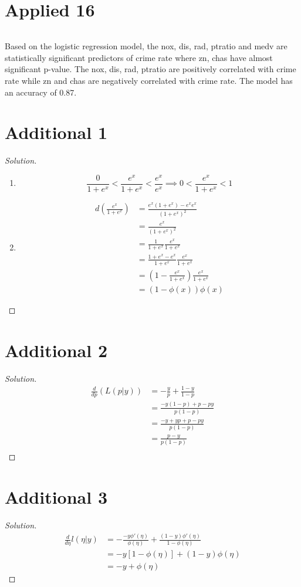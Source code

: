 \documentclass{article}
\newenvironment{solution}
  {\renewcommand\qedsymbol{$\blacksquare$}\begin{proof}[Solution]$ $}
  {\end{proof}}
\begin{document}
\newpage
\section{Applied 16}
\inputminted{r}{q16.R}
Based on the logistic regression model, the nox, dis, rad, ptratio and medv are statistically significant predictors of crime rate where zn, chas have almost significant p-value. The nox, dis, rad, ptratio are positively correlated with crime rate while zn and chas are negatively correlated with crime rate. The model has an accuracy of 0.87.

\newpage
\section{Additional 1}
\begin{solution}
\begin{enumerate}[label=(\alph*)]
\item 
\[\frac{0}{1+e^x} < \frac{e^x}{1+e^x} < \frac{e^{x}}{e^{x}} \implies 0 < \frac{e^x}{1+e^x} <  1\]
\item
\begin{align*}
d(\frac{e^x}{1+e^x}) &= \frac{e^x(1+e^x) - e^x e^x}{(1+e^x)^2} \\
&= \frac{e^x}{(1+e^x)^2} \\
&= \frac{1}{1+e^x} \frac{e^x}{1+e^x} \\
&= \frac{1+e^x - e^x}{1+e^x} \frac{e^x}{1+e^x} \\
&= (1 - \frac{e^x}{1+e^x}) \frac{e^x}{1+e^x} \\
&= (1 - \phi(x)) \phi(x)
\end{align*}
\end{enumerate}
\end{solution}
\section{Additional 2}
\begin{solution}
\begin{align*}
\frac{d}{dp}(L(p|y)) &= -\frac{y}{p} + \frac{1-y}{1-p} \\
&= \frac{-y(1-p) + p - py}{p(1-p)} \\
&= \frac{-y + yp + p - py}{p(1-p)} \\
&= \frac{p - y}{p(1-p)} \\
\end{align*}
\end{solution}
\section{Additional 3}
\begin{solution}
\begin{align*}
\frac{d}{d\eta} l(\eta|y) &= -\frac{-y \phi'(\eta)}{\phi(\eta)} + \frac{(1-y)\phi'(\eta)}{1-\phi(\eta)} \\
&= -y[1-\phi(\eta)] + (1-y)\phi(\eta) \\
&= -y + \phi(\eta)
\end{align*}
\end{solution}
\newpage
\end{document}
